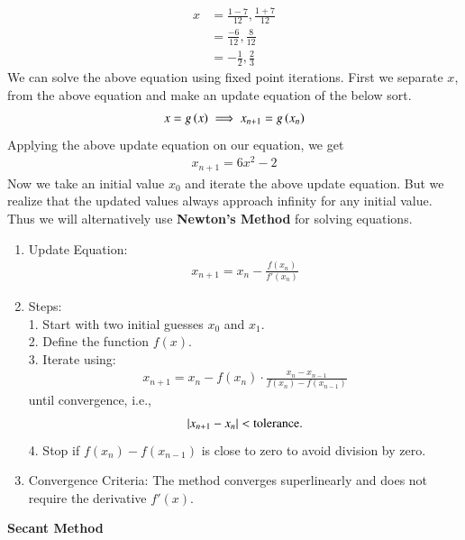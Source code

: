 \documentclass[journal]{IEEEtran}
\begin{document}
\begin{align}
x &= \frac{1 - 7}{12}, \frac{1 + 7}{12} \\
&= \frac{-6}{12}, \frac{8}{12} \\
&= -\frac{1}{2}, \frac{2}{3}
\end{align}
We can solve the above equation using fixed point iterations. First we separate $x$, from the above equation and make an update equation of the below sort.
\begin{align}
	x = g\left(x\right) \implies x_{n+1} = g\left(x_n\right)
\end{align}
Applying the above update equation on our equation, we get
\begin{align}
	x_{n+1} = 6x^2 - 2
\end{align}
Now we take an initial value $x_0$ and iterate the above update equation. But we realize that the updated values always approach infinity for any initial value. \\
Thus we will alternatively use \textbf{Newton's Method} for solving equations.
\begin{enumerate}
\item Update Equation:
\begin{align}
 x_{n+1} = x_n - \frac{f(x_n)}{f'(x_n)}   
\end{align}
\item{Steps:}\\
1. Start with two initial guesses $x_0$  and $x_1$.\\
2. Define the function $f(x)$.\\
3. Iterate using:
   \begin{align}
   x_{n+1} = x_n - f(x_n) \cdot \frac{x_n - x_{n-1}}{f(x_n) - f(x_{n-1})}    
   \end{align}
   until convergence, i.e.,
   \begin{align}
   \left\vert x_{n+1} - x_n\right\vert < \text{tolerance}.
   \end{align}
4. Stop if $ f(x_n) - f(x_{n-1}) $ is close to zero to avoid division by zero.

\item{Convergence Criteria:}
The method converges superlinearly and does not require the derivative $ f'(x) $.
\end{enumerate}
\textbf{Secant Method}
\end{document}

